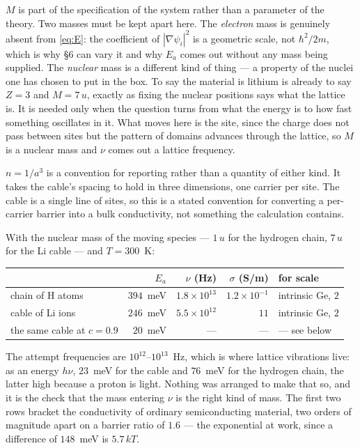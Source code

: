 \documentclass[11pt]{article}
\newcommand{\grad}{\nabla}
\begin{document}
$M$ is part of the specification of the system rather than a parameter of the theory. Two masses
must be kept apart here. The \emph{electron} mass is genuinely absent from \eqref{eq:E}: the
coefficient of $|\grad\psi_i|^2$ is a geometric scale, not $\hbar^2/2m$, which is why \S6 can vary
it and why $E_a$ comes out without any mass being supplied. The \emph{nuclear} mass is a different
kind of thing --- a property of the nuclei one has chosen to put in the box. To say the material is
lithium is already to say $Z=3$ and $M=7\,u$, exactly as fixing the nuclear positions says what the
lattice is. It is needed only when the question turns from what the energy is to how fast something
oscillates in it. What moves here is the site, since the charge does not pass between sites but the
pattern of domains advances through the lattice, so $M$ is a nuclear mass and $\nu$ comes out a
lattice frequency.

$n=1/a^3$ is a convention for reporting rather than a quantity of either kind. It takes the cable's
spacing to hold in three dimensions, one carrier per site. The cable is a
single line of sites, so this is a stated convention for converting a per-carrier barrier into a bulk
conductivity, not something the calculation contains.

With the nuclear mass of the moving species --- $1\,u$ for the hydrogen chain, $7\,u$ for the
Li cable --- and $T=300$~K:

\begin{center}
\small
\begin{tabular}{@{}lrrrl@{}}
\toprule
 & $E_a$ & $\nu$ (Hz) & $\sigma$ (S/m) & for scale\\
\midrule
chain of H atoms & $394$~meV & $1.8\times10^{13}$ & $1.2\times10^{-1}$ & intrinsic Ge, $2$\\
cable of Li ions & $246$~meV & $5.5\times10^{12}$ & $11$ & intrinsic Ge, $2$\\
\quad the same cable at $c=0.9$ & $20$~meV & --- & --- & --- see below\\
\bottomrule
\end{tabular}
\end{center}

\noindent The attempt frequencies are $10^{12}$--$10^{13}$~Hz, which is where lattice vibrations
live: as an energy $h\nu$, $23$~meV for the cable and $76$~meV for the hydrogen chain, the latter high because a proton
is light. Nothing was arranged to make that so, and it is the check that the mass entering $\nu$ is
the right kind of mass. The first two rows bracket the conductivity of ordinary semiconducting
material, two orders of magnitude apart on a barrier ratio of $1.6$ --- the exponential at work,
since a difference of $148$~meV is $5.7\,kT$.
\end{document}
